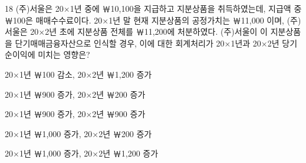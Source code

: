 \begin{question}{18}
(주)서울은 20×1년 중에 ￦10,100을 지급하고 지분상품을 취득하였는데, 지급액 중 ￦100은 매매수수료이다. 20×1년 말 현재 지분상품의 공정가치는 ￦11,000 이며, (주)서울은 20×2년 초에 지분상품 전체를 ￦11,200에 처분하였다. (주)서울이 이 지분상품을 단기매매금융자산으로 인식할 경우, 이에 대한 회계처리가 20×1년과 20×2년 당기순이익에 미치는 영향은?
\begin{choices}
  \item 20×1년 ￦100 감소, 20×2년 ￦1,200 증가
  \item 20×1년 ￦900 증가, 20×2년 ￦200 증가
  \item 20×1년 ￦900 증가, 20×2년 ￦900 증가
  \item 20×1년 ￦1,000 증가, 20×2년 ￦200 증가
  \item 20×1년 ￦1,000 증가, 20×2년 ￦1,200 증가
\end{choices}
\end{question}
